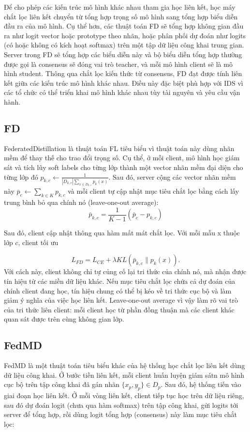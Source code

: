 Để cho phép các kiến trúc mô hình khác nhau tham gia học liên kết, học máy chắt lọc liên kết chuyển từ tổng hợp trọng số mô hình sang tổng hợp biểu diễn đầu ra của mô hình. Cụ thể hơn, các thuật toán FD sẽ tổng hợp không gian đầu ra như logit vector hoặc prototype theo nhãn, hoặc phân phối dự đoán như logits (có hoặc không có kích hoạt softmax) trên một tập dữ liệu công khai trung gian. Server trong FD sẽ tổng hợp các biểu diễn này và bộ biểu diễn tổng hợp thường được gọi là consensus sẽ đóng vai trò teacher, và mỗi mô hình client sẽ là mô hình student. Thông qua chắt lọc kiến thức từ consensus, FD đạt được tính liên kết giữa các kiến trúc mô hình khác nhau. Điều này đặc biệt phù hợp với IDS vì các tổ chức có thể triển khai mô hình khác nhau tùy tài nguyên và yêu cầu vận hành.

\subsection{FD}

FederatedDistillation \cite{jeong2018federateddistillation} là thuật toán FL tiêu biểu vì thuật toán này dùng nhãn mềm để thay thế cho trao đổi trọng số. Cụ thể, ở mỗi client, mô hình học giám sát và tích lũy soft labels cho từng lớp thành một vector nhãn mềm đại diện cho từng lớp đó $p_{k,c} \leftarrow \frac{1}{|D_{k,c}|\sum_{x \in D_{k,c}}p_k(x)}$. Sau đó, server cộng các vector nhãn mềm này $\bar p_{c} \leftarrow \sum_{k \in K} p_{k,c}$ và mỗi client tự cập nhật mục tiêu chắt lọc bằng cách lấy trung bình bỏ qua chính nó (leave-one-out average):
$$
\bar p_{k,c}=\frac{1}{K-1} (\bar p_c - p_{k,c})
$$

Sau đó, client cập nhật thông qua hàm mất mát chắt lọc. Với mỗi mẫu x thuộc lớp $c$, client tối ưu

$$
L_{FD} = L_{CE} + \lambda KL(\bar p_{k,c} \| p_k(x)).
$$
Với cách này, client không chỉ tự củng cố lại tri thức của chính nó, mà nhận được tín hiệu từ các miền dữ liệu khác. Nếu mục tiêu chắt lọc chứa cả dự đoán của chính client đang học, tín hiệu chung có thể bị kéo về tri thức cục bộ và làm giảm ý nghĩa của việc học liên kết. Leave-one-out average vì vậy làm rõ vai trò của tri thức liên client: mỗi client học từ phần đồng thuận mà các client khác quan sát được trên cùng không gian lớp.

\subsection{FedMD}

FedMD \cite{li2019fedmd} là một thuật toán tiêu biểu khác của hệ thống học chắt lọc liên kết dùng dữ liệu công khai. Ở bước tiền liên kết, mỗi client huấn luyện giám sátn mô hình cục bộ trên tập công khai đã gán nhãn $\{x_p, y_p\} \in D_p$. Sau đó, hệ thống tiến vào giai đoạn học liên kết. Ở mỗi vòng liên kết, client tiếp tục học trên dữ liệu riêng, sau đó dự đoán logit (chưa qua hàm softmax) trên tập công khai, gửi logits tới server để tổng hợp, rồi dùng logit tổng hợp (consensus) này làm mục tiêu chắt lọc:


